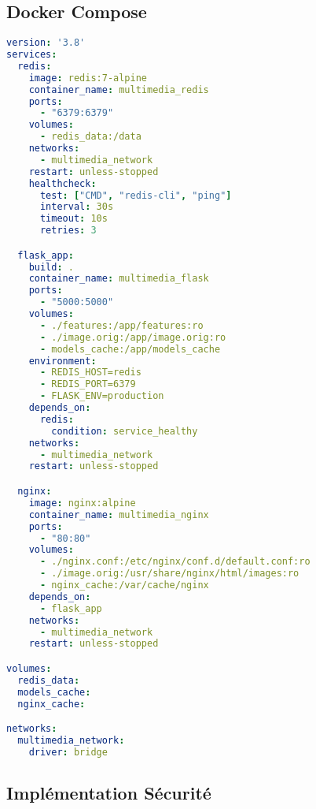 \documentclass[12pt,a4paper]{article}
\begin{document}
\subsection{Docker Compose}

\begin{lstlisting}[language=yaml, caption=docker-compose.yml avec volumes persistants]
version: '3.8'
services:
  redis:
    image: redis:7-alpine
    container_name: multimedia_redis
    ports:
      - "6379:6379"
    volumes:
      - redis_data:/data
    networks:
      - multimedia_network
    restart: unless-stopped
    healthcheck:
      test: ["CMD", "redis-cli", "ping"]
      interval: 30s
      timeout: 10s
      retries: 3

  flask_app:
    build: .
    container_name: multimedia_flask
    ports:
      - "5000:5000"
    volumes:
      - ./features:/app/features:ro
      - ./image.orig:/app/image.orig:ro
      - models_cache:/app/models_cache
    environment:
      - REDIS_HOST=redis
      - REDIS_PORT=6379
      - FLASK_ENV=production
    depends_on:
      redis:
        condition: service_healthy
    networks:
      - multimedia_network
    restart: unless-stopped

  nginx:
    image: nginx:alpine
    container_name: multimedia_nginx
    ports:
      - "80:80"
    volumes:
      - ./nginx.conf:/etc/nginx/conf.d/default.conf:ro
      - ./image.orig:/usr/share/nginx/html/images:ro
      - nginx_cache:/var/cache/nginx
    depends_on:
      - flask_app
    networks:
      - multimedia_network
    restart: unless-stopped

volumes:
  redis_data:
  models_cache:
  nginx_cache:

networks:
  multimedia_network:
    driver: bridge
\end{lstlisting}

\subsection{Implémentation Sécurité}
\end{document}
